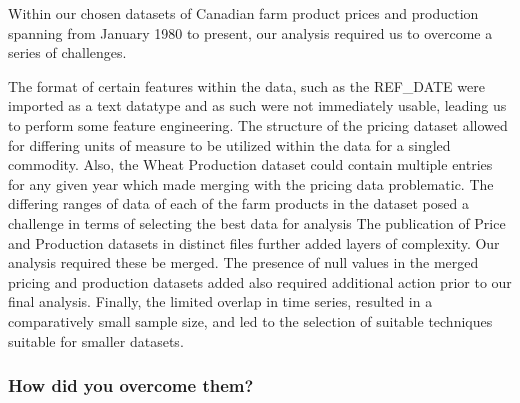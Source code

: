 Within our chosen datasets of Canadian farm product prices and production spanning from January 1980 to present, our analysis required us to overcome a series of challenges.

The format of certain features within the data, such as the REF\_DATE were imported as a text datatype and as such were not immediately usable, leading us to perform some feature engineering.
The structure of the pricing dataset allowed for differing units of measure to be utilized within the data for a singled commodity.
Also, the Wheat Production dataset could contain multiple entries for any given year which made merging with the pricing data problematic.
The differing ranges of data of each of the farm products in the dataset posed a challenge in terms of selecting the best data for analysis
The publication of Price and Production datasets in distinct files further added layers of complexity. Our analysis required these be merged.
The presence of null values in the merged pricing and production datasets added also required additional action prior to our final analysis.
Finally, the limited overlap in time series, resulted in a comparatively small sample size, and led to the selection of suitable techniques suitable for smaller datasets.

\subsubsection{How did you overcome them?}

